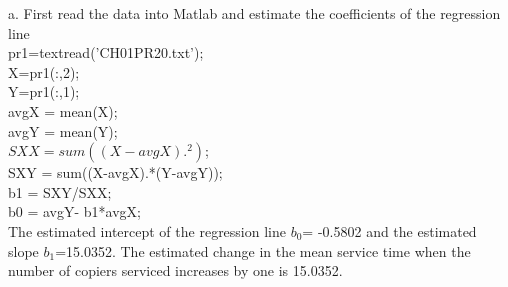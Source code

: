\documentclass[12pt]{article}
\begin{document}
 { \vfill
  \answer
} { 
a. First read the data into Matlab and estimate the coefficients of the regression line\\
pr1=textread('CH01PR20.txt');\\
X=pr1(:,2);\\
Y=pr1(:,1);\\
avgX = mean(X);\\
avgY = mean(Y);\\
$SXX = sum((X-avgX).^2)$;\\
SXY = sum((X-avgX).*(Y-avgY));\\
b1 = SXY/SXX;\\
b0 = avgY- b1*avgX;\\

The estimated intercept of the regression line $b_0$= -0.5802 and the estimated slope $b_1$=15.0352. The estimated change in the mean service time when the number of copiers serviced increases by one is 15.0352. 

}
\end{document}
